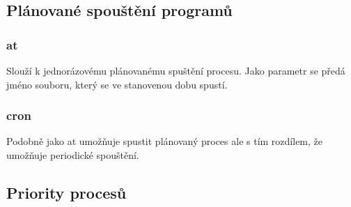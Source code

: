 \documentclass{article}
\begin{document}
\subsection{Plánované spouštění programů}
\subsubsection{at}
Slouží k jednorázovému plánovanému spuštění procesu. Jako parametr se předá jméno souboru, který se ve stanovenou dobu spustí. 
\subsubsection{cron}
Podobně jako at umožňuje spustit plánovaný proces ale s tím rozdílem, že umožňuje periodické spouštění. 

\subsection{Priority procesů}
\end{document}
